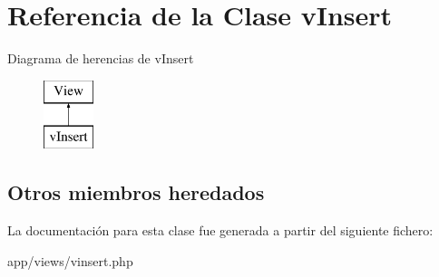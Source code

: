 \hypertarget{classv_insert}{}\section{Referencia de la Clase v\+Insert}
\label{classv_insert}
Diagrama de herencias de v\+Insert\begin{figure}[H]
\begin{center}
\leavevmode
\includegraphics[height=2.000000cm]{classv_insert}
\end{center}
\end{figure}
\subsection*{Otros miembros heredados}


La documentación para esta clase fue generada a partir del siguiente fichero\+:\begin{DoxyCompactItemize}
\item 
app/views/vinsert.\+php\end{DoxyCompactItemize}
